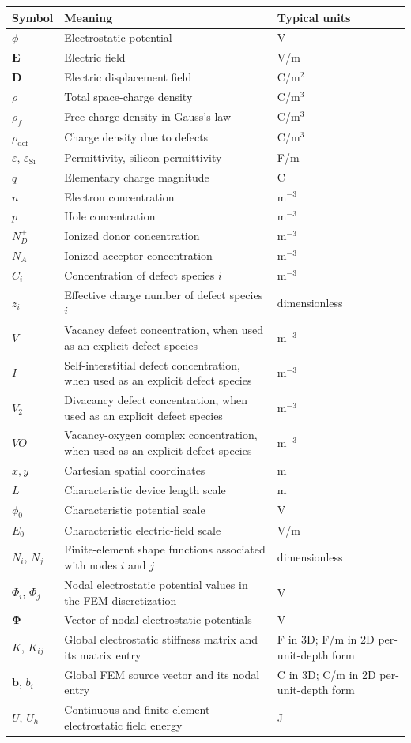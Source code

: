 \documentclass[11pt]{article}
\newcommand{\Evec}{\mathbf{E}}
\newcommand{\Dvec}{\mathbf{D}}
\begin{document}
\renewcommand{\arraystretch}{1.25}
\begin{longtable}{p{} p{} p{}}
\toprule
\textbf{Symbol} & \textbf{Meaning} & \textbf{Typical units} \\
\midrule
\endhead
$\phi$ & Electrostatic potential & V \\
$\Evec$ & Electric field & V/m \\
$\Dvec$ & Electric displacement field & C/m$^2$ \\
$\rho$ & Total space-charge density & C/m$^3$ \\
$\rho_f$ & Free-charge density in Gauss's law & C/m$^3$ \\
$\rho_{\mathrm{def}}$ & Charge density due to defects & C/m$^3$ \\
$\varepsilon$, $\varepsilon_{\mathrm{Si}}$ & Permittivity, silicon permittivity & F/m \\
$q$ & Elementary charge magnitude & C \\
$n$ & Electron concentration & m$^{-3}$ \\
$p$ & Hole concentration & m$^{-3}$ \\
$N_D^+$ & Ionized donor concentration & m$^{-3}$ \\
$N_A^-$ & Ionized acceptor concentration & m$^{-3}$ \\
$C_i$ & Concentration of defect species $i$ & m$^{-3}$ \\
$z_i$ & Effective charge number of defect species $i$ & dimensionless \\
$V$ & Vacancy defect concentration, when used as an explicit defect species & m$^{-3}$ \\
$I$ & Self-interstitial defect concentration, when used as an explicit defect species & m$^{-3}$ \\
$V_2$ & Divacancy defect concentration, when used as an explicit defect species & m$^{-3}$ \\
$VO$ & Vacancy-oxygen complex concentration, when used as an explicit defect species & m$^{-3}$ \\
$x,y$ & Cartesian spatial coordinates & m \\
$L$ & Characteristic device length scale & m \\
$\phi_0$ & Characteristic potential scale & V \\
$E_0$ & Characteristic electric-field scale & V/m \\
$N_i$, $N_j$ & Finite-element shape functions associated with nodes $i$ and $j$ & dimensionless \\
$\Phi_i$, $\Phi_j$ & Nodal electrostatic potential values in the FEM discretization & V \\
$\bm{\Phi}$ & Vector of nodal electrostatic potentials & V \\
$K$, $K_{ij}$ & Global electrostatic stiffness matrix and its matrix entry & F in 3D; F/m in 2D per-unit-depth form \\
$\bm{b}$, $b_i$ & Global FEM source vector and its nodal entry & C in 3D; C/m in 2D per-unit-depth form \\
$U$, $U_h$ & Continuous and finite-element electrostatic field energy & J \\
\bottomrule
\end{longtable}
\end{document}
